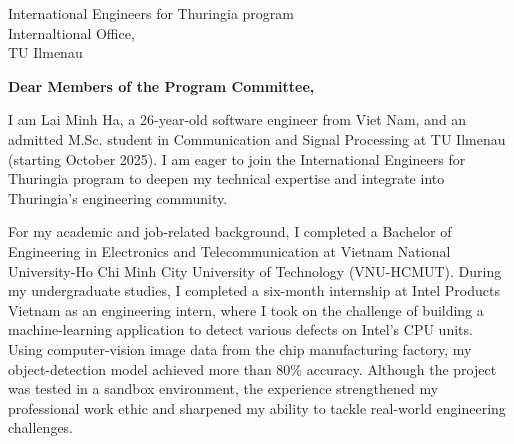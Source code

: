 \documentclass[a4paper,11pt]{letter}
\date{}
\begin{document}
\begin{letter}{
    International Engineers for Thuringia program
    \\ Internaltional Office,
    \\ TU Ilmenau
}



\opening{\textbf{Dear Members of the Program Committee,}}

I am Lai Minh Ha, a 26-year-old software engineer from Viet Nam, and an admitted M.Sc. student in Communication and Signal Processing at TU Ilmenau (starting October 2025). I am eager to join the International Engineers for Thuringia program to deepen my technical expertise and integrate into Thuringia’s engineering community.

For my academic and job-related background, I completed a Bachelor of Engineering in Electronics and Telecommunication at Vietnam National University-Ho Chi Minh City University of Technology (VNU-HCMUT). During my undergraduate studies, I completed a six-month internship at Intel Products Vietnam as an engineering intern, where I took on the challenge of building a machine-learning application to detect various defects on Intel's CPU units. Using computer-vision image data from the chip manufacturing factory, my object-detection model achieved more than 80\% accuracy. Although the project was tested in a sandbox environment, the experience strengthened my professional work ethic and sharpened my ability to tackle real-world engineering challenges.



\end{letter}
\end{document}
